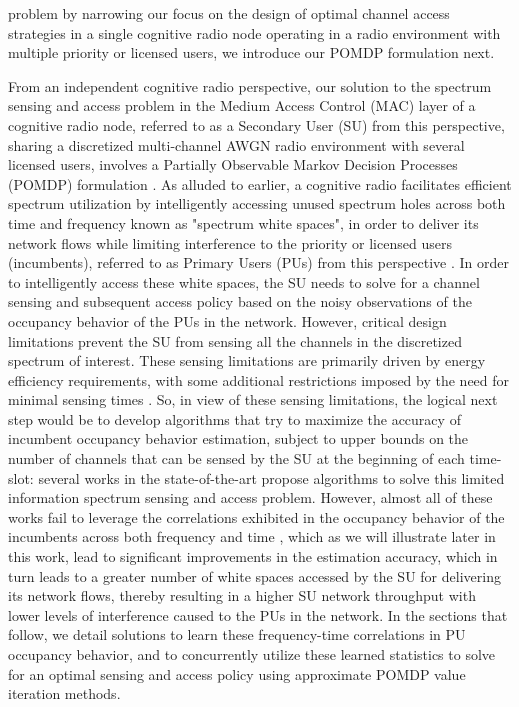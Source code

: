 \documentclass[12pt, draftcls, onecolumn]{IEEEtran}
\begin{document}
problem by narrowing our focus on the design of optimal channel access strategies in a single cognitive radio node operating in a radio environment with multiple priority or licensed users, we introduce our POMDP formulation next.

From an independent cognitive radio perspective, our solution to the spectrum sensing and access problem in the Medium Access Control (MAC) layer of a cognitive radio node, referred to as a Secondary User (SU) from this perspective, sharing a discretized multi-channel AWGN radio environment with several licensed users, involves a Partially Observable Markov Decision Processes (POMDP) formulation \cite{WCL:paper}. As alluded to earlier, a cognitive radio facilitates efficient spectrum utilization by intelligently accessing unused spectrum holes across both time and frequency known as "spectrum white spaces", in order to deliver its network flows while limiting interference to the priority or licensed users (incumbents), referred to as Primary Users (PUs) from this perspective \cite{WCL:2}. In order to intelligently access these white spaces, the SU needs to solve for a channel sensing and subsequent access policy based on the noisy observations of the occupancy behavior of the PUs in the network. However, critical design limitations prevent the SU from sensing all the channels in the discretized spectrum of interest. These sensing limitations are primarily driven by energy efficiency requirements, with some additional restrictions imposed by the need for minimal sensing times \cite{WCL:3}. So, in view of these sensing limitations, the logical next step would be to develop algorithms that try to maximize the accuracy of incumbent occupancy behavior estimation, subject to upper bounds on the number of channels that can be sensed by the SU at the beginning of each time-slot: several works in the state-of-the-art \cite{WCL:4,WCL:5,WCL:6,WCL:7} propose algorithms to solve this limited information spectrum sensing and access problem. However, almost all of these works \cite{WCL:4,WCL:5,WCL:8,WCL:9,WCL:10,WCL:11} fail to leverage the correlations exhibited in the occupancy behavior of the incumbents across both frequency and time \cite{WCL:12}, which as we will illustrate later in this work, lead to significant improvements in the estimation accuracy, which in turn leads to a greater number of white spaces accessed by the SU for delivering its network flows, thereby resulting in a higher SU network throughput with lower levels of interference caused to the PUs in the network. In the sections that follow, we detail solutions to learn these frequency-time correlations in PU occupancy behavior, and to concurrently utilize these learned statistics to solve for an optimal sensing and access policy using approximate POMDP value iteration methods.
\end{document}
